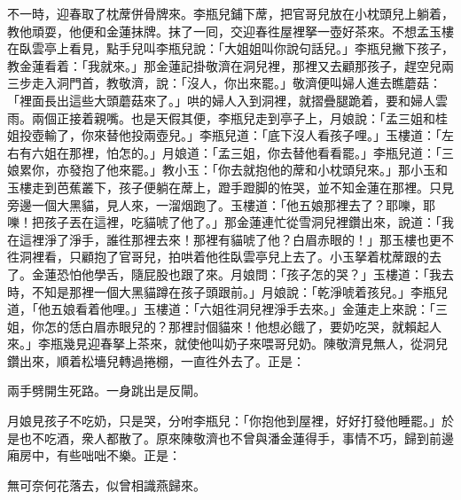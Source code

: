 不一時，迎春取了枕蓆併骨牌來。李瓶兒鋪下蓆，把官哥兒放在小枕頭兒上躺着，教他頑耍，他便和金蓮抹牌。抹了一囘，交迎春徃屋裡拏一壺好茶來。不想孟玉樓在臥雲亭上看見，點手兒叫李瓶兒說：「大姐姐叫你說句話兒。」李瓶兒撇下孩子，教金蓮看着：{}「我就來。」那金蓮記掛敬濟在洞兒裡，那裡又去顧那孩子，趕空兒兩三步走入洞門首，教敬濟，說：「沒人，你出來罷。」敬濟便叫婦人進去瞧蘑菇：「裡面長出這些大頭蘑菇來了。」哄的婦人入到洞裡，就摺疊腿跪着，要和婦人雲雨。兩個正接着親嘴。也是天假其便，李瓶兒走到亭子上，月娘說：「孟三姐和桂姐投壺輸了，你來替他投兩壺兒。」李瓶兒道：「底下沒人看孩子哩。」玉樓道：「左右有六姐在那裡，怕怎的。」月娘道：「孟三姐，你去替他看看罷。」{}李瓶兒道：「三娘累你，亦發抱了他來罷。」{}教小玉：「你去就抱他的蓆和小枕頭兒來。」那小玉和玉樓走到芭蕉叢下，孩子便躺在蓆上，蹬手蹬脚的恠哭，並不知金蓮在那裡。只見旁邊一個大黑貓，見人來，一溜烟跑了。玉樓道：「他五娘那裡去了？耶嚛，耶嚛！把孩子丟在這裡，吃貓唬了他了。」那金蓮連忙從雪洞兒裡鑽出來，說道：「我在這裡淨了淨手，誰徃那裡去來！那裡有貓唬了他？白眉赤眼的！」那玉樓也更不徃洞裡看，只顧抱了官哥兒，拍哄着他徃臥雲亭兒上去了。小玉拏着枕蓆跟的去了。金蓮恐怕他學舌，隨屁股也跟了來。{}月娘問：「孩子怎的哭？」玉樓道：「我去時，不知是那裡一個大黑貓蹲在孩子頭跟前。」月娘說：「乾淨唬着孩兒。」李瓶兒道，「他五娘看着他哩。」玉樓道：「六姐徃洞兒裡淨手去來。」金蓮走上來說：「三姐，你怎的恁白眉赤眼兒的？那裡討個貓來！他想必餓了，要奶吃哭，就賴起人來。」{}李瓶幾見迎春拏上茶來，就使他叫奶子來喂哥兒奶。陳敬濟見無人，從洞兒鑽出來，順着松墻兒轉過捲棚，一直徃外去了。正是：

\begin{myquote}
兩手劈開生死路。一身跳出是反閘。
\end{myquote}

月娘見孩子不吃奶，只是哭，分咐李瓶兒：「你抱他到屋裡，好好打發他睡罷。」於是也不吃酒，衆人都散了。原來陳敬濟也不曾與潘金蓮得手，事情不巧，歸到前邊廂房中，有些咄咄不樂。正是：

\begin{myquote}
無可奈何花落去，似曾相識燕歸來。
\end{myquote}

